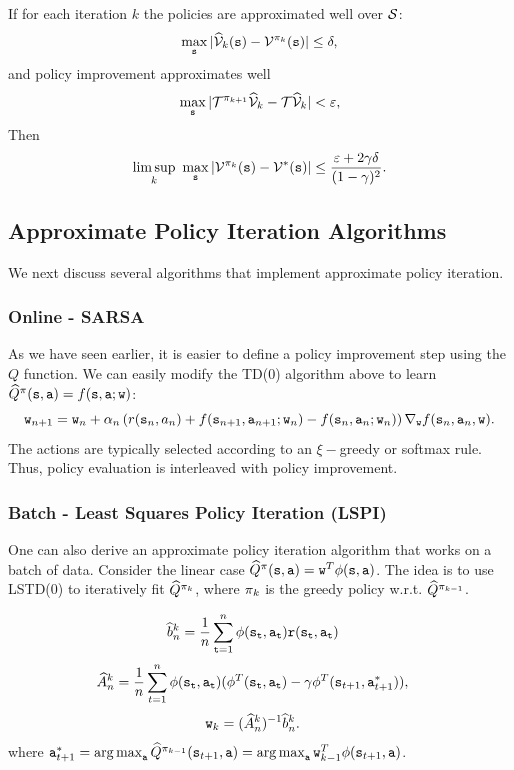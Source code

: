 \begin{theorem}\label{thm:API}
If for each iteration $k$ the policies are approximated well over $\mathcal{S}$:
$$\max_{\tt s} |\widehat{\mathcal{V}}_k({\tt s})-\mathcal{V}^{\pi_k}({\tt s})| \le \delta,$$
and policy improvement approximates well
$$ \max_{\tt s} |\mathcal{T}^{\pi_{k+1}}\widehat{\mathcal{V}}_k - \mathcal{T}\widehat{\mathcal{V}}_k| < \varepsilon,$$
Then
$$ \limsup_k \ \max_{\tt s} | \mathcal{V}^{\pi_k}({\tt s})-\mathcal{V}^*({\tt s})| \le \frac{\varepsilon+2\gamma\delta}{(1-\gamma)^2}.$$
\end{theorem}

\subsection{Approximate Policy Iteration Algorithms}

We next discuss several algorithms that implement approximate policy iteration.

\subsubsection{Online - SARSA}
As we have seen earlier, it is easier to define a policy improvement step using the $Q$ function. We can easily modify the TD(0) algorithm above to learn $\widehat{Q}^\pi({\tt s},{\tt a}) = f({\tt s},{\tt a};{\tt w})$:
\begin{equation*}
    {\tt w}_{n+1} = {\tt w}_n + \alpha_n \left( r({\tt s}_n,a_n) + f({\tt s}_{n+1},{\tt a}_{n+1};{\tt w}_n) - f({\tt s}_{n},{\tt a}_{n}; {\tt w}_n) \right) \nabla_{{\tt w}} f({\tt s}_n,{\tt a}_n,{\tt w}).
\end{equation*}
The actions are typically selected according to an $\xi-$greedy or softmax rule. Thus, policy evaluation is interleaved with policy improvement.

\subsubsection{Batch - Least Squares Policy Iteration (LSPI)}
One can also derive an approximate policy iteration algorithm that works on a batch of data. Consider the linear case $\widehat{Q}^\pi({\tt s},{\tt a}) = {\tt w}^T \phi({\tt s},{\tt a})$. The idea is to use LSTD(0) to iteratively fit $\widehat{Q}^{\pi_k}$, where $\pi_k$ is the greedy policy w.r.t. $\widehat{Q}^{\pi_{k-1}}$.

\begin{align*}
\widehat{b}_n^k &= \frac{1}{n} \sum_{{\tt t}=1}^n  {\phi}({\tt s}_{\tt t}, {\tt a}_{\tt t}) {\tt r}({\tt s}_{\tt t},{\tt a}_{\tt t}) 
\end{align*}
\begin{align*}
\widehat{A}_n^k &= \frac{1}{n} \sum_{t=1}^n {\phi}({\tt s}_{\tt t},{\tt a}_{\tt t})( {\phi}^T({\tt s}_{\tt t},{\tt a}_{\tt t})-\gamma {\phi}^T({\tt s}_{t+1},{\tt a}^*_{t+1})),
\end{align*}
\begin{align*}
{\tt w}_k &= (\widehat{A}_n^k)^{-1} \widehat{b}_n^k.
\end{align*}
where $\action^*_{t+1} = \argmax_\action \widehat{Q}^{\policy_{k-1}}(\state_{t+1},\action) = \argmax_\action \weights_{k-1}^T\ftrs(\state_{t+1},\action)$.

